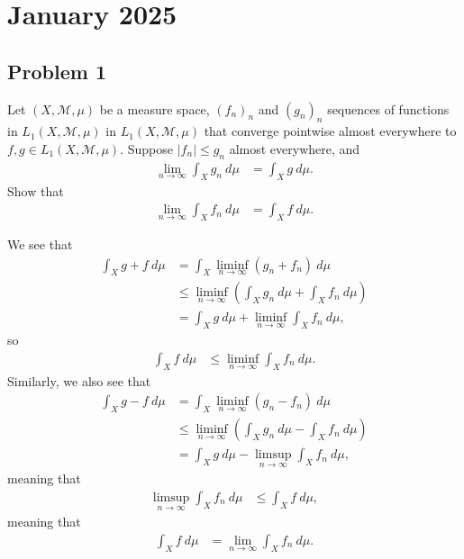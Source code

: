 \documentclass[10pt]{mypackage}
\begin{document}
\section{January 2025}%
\subsection{Problem 1}%
\begin{problem}
  Let $\left( X,\mathcal{M},\mu \right)$ be a measure space, $\left( f_n \right)_n$ and $\left( g_n \right)_n$ sequences of functions in $L_1\left( X,\mathcal{M},\mu \right)$ in $L_1\left( X,\mathcal{M},\mu \right)$ that converge pointwise almost everywhere to $f,g\in L_1\left( X,\mathcal{M},\mu \right)$. Suppose $\left\vert f_n \right\vert \leq g_n$ almost everywhere, and
  \begin{align*}
    \lim_{n\rightarrow\infty} \int_{X}^{} g_n\:d\mu &= \int_{X}^{} g\:d\mu.
  \end{align*}
  Show that
  \begin{align*}
    \lim_{n\rightarrow\infty} \int_{X}^{} f_n\:d\mu &= \int_{X}^{} f\:d\mu.
  \end{align*}
\end{problem}
We see that
\begin{align*}
  \int_{X}^{} g + f\:d\mu &= \int_{X}^{} \liminf_{n\rightarrow\infty}\left( g_n + f_n \right)\:d\mu\\
                          &\leq \liminf_{n\rightarrow\infty}\left( \int_{X}^{} g_n\:d\mu + \int_{X}^{} f_n\:d\mu \right)\\
                          &= \int_{X}^{} g\:d\mu + \liminf_{n\rightarrow\infty} \int_{X}^{} f_n\:d\mu,
\end{align*}
so
\begin{align*}
  \int_{X}^{} f\:d\mu &\leq \liminf_{n\rightarrow\infty} \int_{X}^{} f_n\:d\mu.
\end{align*}
Similarly, we also see that
\begin{align*}
  \int_{X}^{} g-f\:d\mu &= \int_{X}^{} \liminf_{n\rightarrow\infty}\left( g_n-f_n \right)\:d\mu\\
                        &\leq \liminf_{n\rightarrow\infty} \left( \int_{X}^{} g_n\:d\mu - \int_{X}^{} f_n\:d\mu \right)\\
                        &= \int_{X}^{} g\:d\mu - \limsup_{n\rightarrow\infty} \int_{X}^{} f_n\:d\mu,
\end{align*}
meaning that
\begin{align*}
  \limsup_{n\rightarrow\infty} \int_{X}^{} f_n\:d\mu &\leq \int_{X}^{} f\:d\mu,
\end{align*}
meaning that
\begin{align*}
  \int_{X}^{} f\:d\mu &= \lim_{n\rightarrow\infty} \int_{X}^{} f_n\:d\mu.
\end{align*}
\end{document}
